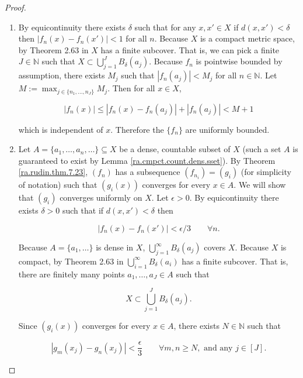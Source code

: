 \begin{proof}

\begin{enumerate}

\item

By equicontinuity there exists \(\delta\) such that for any \(x, x' \in X\) if \(d(x, x') < \delta\) then \(|f_n(x) - f_n(x')| < 1\) for all \(n\). Because \(X\) is a compact metric space, by Theorem 2.63 in \citet{pugh2015real} \(X\) has a finite subcover. That is, we can pick a finite \(J \in \mathbb{N}\) such that \(X \subset \bigcup_{j=1}^J B_\delta(a_j)\). Because \(f_n\) is pointwise bounded by assumption, there exists \(M_j\) such that \(|f_n(a_j)| < M_j\) for all \(n \in \mathbb{N}\). Let \(M := \max_{j \in \{n_1, \ldots, n_J\}} M_j\). Then for all \(x \in X\), 

\[
|f_n(x)| \leq   |f_n(x) - f_n(a_j)| + |f_n(a_j)| <  M + 1 
\]

which is independent of \(x\). Therefore the \(\{f_n\}\) are uniformly bounded.

\item

Let \(A = \{a_1, \ldots, a_n, \ldots\} \subseteq X\) be a dense, countable subset of \(X\) (such a set \(A\) is guaranteed to exist by Lemma \ref{ra.cmpct.count.dens.sset}). By Theorem \ref{ra.rudin.thm.7.23}, \((f_n)\) has a subsequence \((f_{n_i}) = (g_i)\) (for simplicity of notation) such that \((g_i(x))\) converges for every \(x \in A\). We will show that \((g_i)\) converges uniformly on \(X\). Let \(\epsilon >0\). By equicontinuity there exists \(\delta>0\) such that if \(d(x,x') < \delta\) then 

\begin{equation}\label{4.16.conv.again}
|f_n(x) - f_n(x')| < \epsilon/3 \qquad \forall n.
\end{equation}

Because \(A = \{a_1, \ldots\}\) is dense in \(X\), \(\bigcup_{j=1}^\infty B_\delta(a_j)\) covers \(X\). Because \(X\) is compact, by Theorem 2.63 in \citet{pugh2015real} \(\bigcup_{i=1}^\infty B_\delta(a_i)\) has a finite subcover. That is, there are finitely many points \(a_1, \ldots, a_{J} \in A\) such that 

\[
X \subset \bigcup_{j=1}^J B_\delta(a_j).
\] 

Since \((g_i(x))\) converges for every \(x \in A\), there exists \(N \in \mathbb{N}\) such that 

\begin{equation}\label{4.16.cauchy.again}
|g_m(x_j) - g_n(x_j)| < \frac{\epsilon}{3} \qquad  \forall m, n \geq N, \text{ and any } j \in [J].
\end{equation}


\end{enumerate}
\end{proof}
